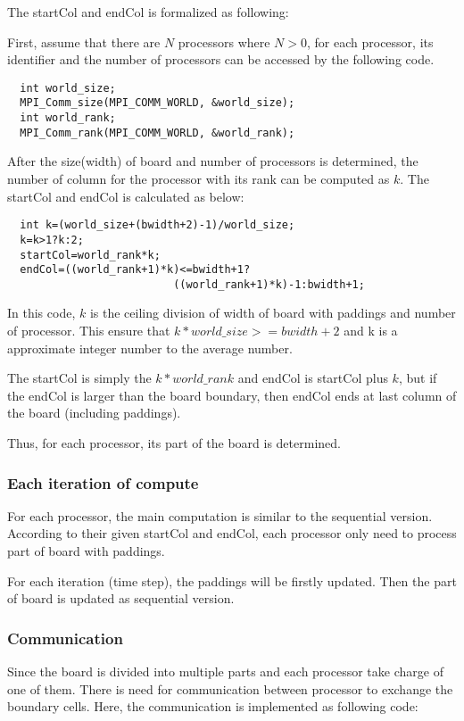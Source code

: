 \documentclass[sigchi]{acmart}
\begin{document}
The startCol and endCol is formalized as following:

First, assume that there are $N$ processors where $N>0$, for each processor, its identifier and the number of processors can be accessed by the following code.
\begin{lstlisting}
  int world_size;
  MPI_Comm_size(MPI_COMM_WORLD, &world_size);
  int world_rank;
  MPI_Comm_rank(MPI_COMM_WORLD, &world_rank);
\end{lstlisting}

After the size(width) of board and number of processors is determined, the number of column for the processor with its rank can be computed as $k$.
The startCol and endCol is calculated as below: 

\begin{lstlisting}
  int k=(world_size+(bwidth+2)-1)/world_size;
  k=k>1?k:2;
  startCol=world_rank*k;
  endCol=((world_rank+1)*k)<=bwidth+1?
                          ((world_rank+1)*k)-1:bwidth+1;
\end{lstlisting}

In this code, $k$ is the ceiling division of width of board with paddings and number of processor. 
This ensure that $k*world\_size>=bwidth+2$ and k is a approximate integer number to the average number.

The startCol is simply the $k*world\_rank$ and endCol is startCol plus $k$, but if the endCol is larger than the board boundary, then endCol ends at last column of the board (including paddings).

Thus, for each processor, its part of the board is determined.

\subsubsection{Each iteration of compute}

For each processor, the main computation is similar to the sequential version. According to their given startCol and endCol, each processor only need to process part of board with paddings.

For each iteration (time step), the paddings will be firstly updated. Then the part of board is updated as sequential version.


\subsubsection{Communication}

Since the board is divided into multiple parts and each processor take charge of one of them. 
There is need for communication between processor to exchange the boundary cells. Here, the communication is implemented as following code:
\end{document}
